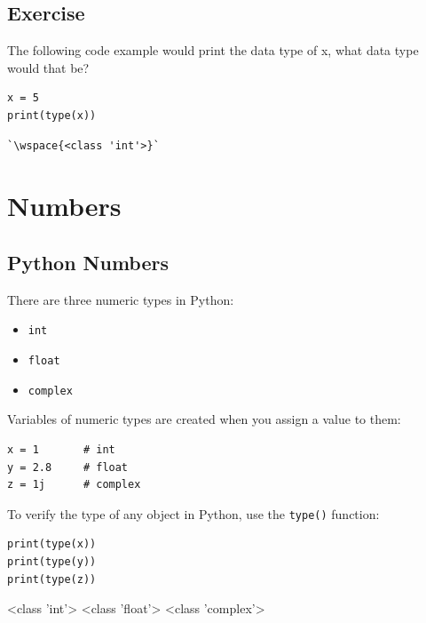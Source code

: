 \documentclass[12pt,a4paper]{article}
\newcommand{\wspace}[1]{%
	\color{white}\colorbox{white}{\texttt{#1}}%
}
\newcommand{\code}[1]{%
	\colorbox{backcolour}{\lstinline{#1}}%
}
\begin{document}
\subsection{Exercise}
\begin{tbox}
The following code example would print the data type of x, what data type would that be?

\begin{lstlisting}[numbers=none]
x = 5
print(type(x))
	\end{lstlisting}
\tcblower
	\begin{lstlisting}[numbers=none]
`\wspace{<class 'int'>}`
	\end{lstlisting}
\end{tbox}
\vfill\newpage
\section{Numbers}
\subsection{Python Numbers}

There are three numeric types in Python:

\begin{itemize}
	\item \code{int}
	\item \code{float}
	\item \code{complex}
\end{itemize}

Variables of numeric types are created when you assign a value to them:

\begin{ebox}
	\begin{lstlisting}
x = 1		# int
y = 2.8		# float
z = 1j		# complex
	\end{lstlisting}
\end{ebox}

To verify the type of any object in Python,
use the \code{type()} function:

\begin{ebox}
	\begin{lstlisting}
print(type(x))
print(type(y))
print(type(z))
	\end{lstlisting}
\tcblower
	\begin{vercode}
<class 'int'>
<class 'float'>
<class 'complex'>
	\end{vercode}
\end{ebox}
\end{document}
